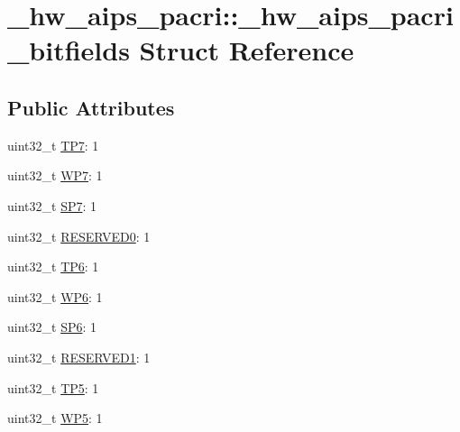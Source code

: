 \hypertarget{struct__hw__aips__pacri_1_1__hw__aips__pacri__bitfields}{}\section{\+\_\+hw\+\_\+aips\+\_\+pacri\+:\+:\+\_\+hw\+\_\+aips\+\_\+pacri\+\_\+bitfields Struct Reference}
\label{struct__hw__aips__pacri_1_1__hw__aips__pacri__bitfields}
\subsection*{Public Attributes}
\begin{DoxyCompactItemize}
\item 
uint32\+\_\+t \hyperlink{struct__hw__aips__pacri_1_1__hw__aips__pacri__bitfields_af6625d09634392b813504b18722f22c4}{T\+P7}\+: 1
\item 
uint32\+\_\+t \hyperlink{struct__hw__aips__pacri_1_1__hw__aips__pacri__bitfields_a95772accdae6e90c613e82ec62f3bab7}{W\+P7}\+: 1
\item 
uint32\+\_\+t \hyperlink{struct__hw__aips__pacri_1_1__hw__aips__pacri__bitfields_a90b048e464bec4930ae3c9b2062269be}{S\+P7}\+: 1
\item 
uint32\+\_\+t \hyperlink{struct__hw__aips__pacri_1_1__hw__aips__pacri__bitfields_a879cf998d5187eba6ec7ff7175bfb012}{R\+E\+S\+E\+R\+V\+E\+D0}\+: 1
\item 
uint32\+\_\+t \hyperlink{struct__hw__aips__pacri_1_1__hw__aips__pacri__bitfields_a9ce48937541843d71fcc1f725af91409}{T\+P6}\+: 1
\item 
uint32\+\_\+t \hyperlink{struct__hw__aips__pacri_1_1__hw__aips__pacri__bitfields_a9eae195b495c8bd1089ec3eb3ceedae9}{W\+P6}\+: 1
\item 
uint32\+\_\+t \hyperlink{struct__hw__aips__pacri_1_1__hw__aips__pacri__bitfields_aadb6e95d959e76a92df87ceb7a868b63}{S\+P6}\+: 1
\item 
uint32\+\_\+t \hyperlink{struct__hw__aips__pacri_1_1__hw__aips__pacri__bitfields_ae6305d2b3b3856edae6de705cd4fd303}{R\+E\+S\+E\+R\+V\+E\+D1}\+: 1
\item 
uint32\+\_\+t \hyperlink{struct__hw__aips__pacri_1_1__hw__aips__pacri__bitfields_a9498e1fc490c4778a34bf8d31713d9d6}{T\+P5}\+: 1
\item 
uint32\+\_\+t \hyperlink{struct__hw__aips__pacri_1_1__hw__aips__pacri__bitfields_ae3700af6af453b708297fcff9c9b0b53}{W\+P5}\+: 1

\end{DoxyCompactItemize}
